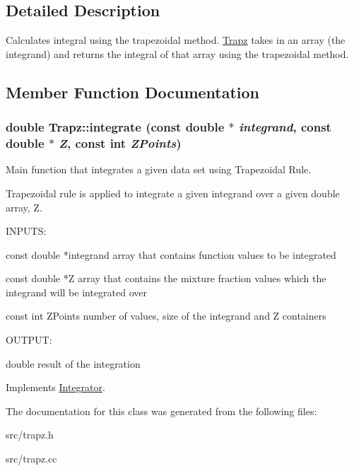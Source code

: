 \subsection{Detailed Description}
Calculates integral using the trapezoidal method. \hyperlink{classTrapz}{Trapz} takes in an array (the integrand) and returns the integral of that array using the trapezoidal method. 

\subsection{Member Function Documentation}
\hypertarget{classTrapz_a8aee327ed631f75ef3dea7e458f71cca}{
\subsubsection[{integrate}]{\setlength{\rightskip}{0pt plus 5cm}double Trapz::integrate (const double $\ast$ {\em integrand}, \/  const double $\ast$ {\em Z}, \/  const int {\em ZPoints})}}
\label{d8/da8/classTrapz_a8aee327ed631f75ef3dea7e458f71cca}


Main function that integrates a given data set using Trapezoidal Rule. 

Trapezoidal rule is applied to integrate a given integrand over a given double array, Z.

\begin{DoxyVerb}
  INPUTS:

  const double *integrand          array that contains function values to be integrated

  const double *Z                  array that contains the mixture fraction values which the integrand will be integrated over

  const int ZPoints                number of values, size of the integrand and Z containers

  
  OUTPUT:

  double                           result of the integration
 
  \end{DoxyVerb}
 

Implements \hyperlink{classIntegrator_a89fbef2f7923ce4e2c979b2ff1d1f4ac}{Integrator}.



The documentation for this class was generated from the following files:\begin{DoxyCompactItemize}
\item 
src/trapz.h\item 
src/trapz.cc\end{DoxyCompactItemize}
